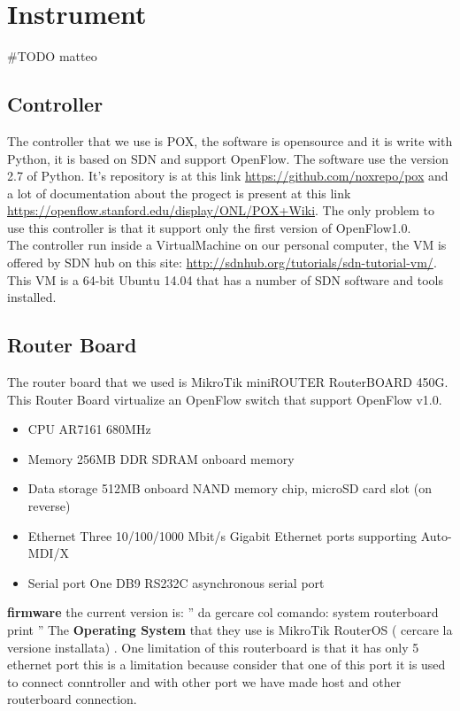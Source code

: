 \documentclass[conference,10pt]{IEEEtran}
\begin{document}
\section{Instrument}\label{sec:instrument}
\#TODO matteo
  \subsection{Controller}
  The controller that we use is POX, the software is opensource and it is write with Python, it is based on SDN and support OpenFlow.
  The software use the version 2.7 of Python.
  It's repository is at this link \url{https://github.com/noxrepo/pox} and a lot of documentation about the progect
  is present at this link \url{https://openflow.stanford.edu/display/ONL/POX+Wiki}.
  The only problem to use this controller is that it support only the first version of OpenFlow1.0.
  \\
  The controller run inside a VirtualMachine on our personal computer,
  the VM is offered by SDN hub on this site: \url{http://sdnhub.org/tutorials/sdn-tutorial-vm/}.
  This VM is a 64-bit Ubuntu 14.04 that has a number of SDN software and tools installed.
  \subsection{Router Board}
  The router board that we used is MikroTik miniROUTER RouterBOARD 450G. This Router Board virtualize an OpenFlow switch that support
  OpenFlow v1.0\cite{routerboard_doc}.
  \begin{itemize}
   \item CPU		AR7161 680MHz
   \item Memory		256MB DDR SDRAM onboard memory
   \item Data storage	512MB onboard NAND memory chip, microSD card slot (on reverse)
   \item Ethernet 	Three 10/100/1000 Mbit/s Gigabit Ethernet ports supporting Auto-MDI/X
   \item Serial port 	One DB9 RS232C asynchronous serial port
  \end{itemize}
  \textbf{firmware} the current version is: '' da gercare col comando: system routerboard print ''
  \newline
  The \textbf{Operating System} that they use is MikroTik RouterOS ( cercare la versione installata) \cite{routeboard_software}.
  \newline
  One limitation of this routerboard is that it has only 5 ethernet port this is a limitation because consider that one of this port it is
  used to connect conntroller and with other port we have made host and other routerboard connection.
\end{document}
